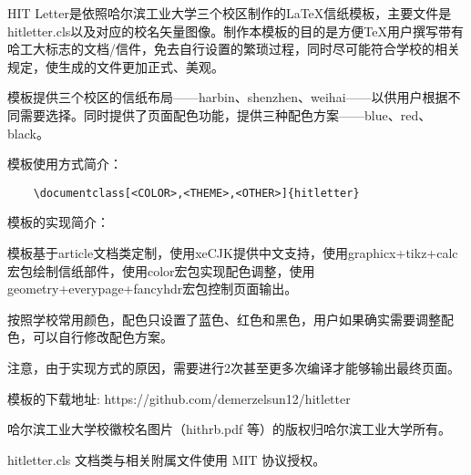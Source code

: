 \documentclass[blue,harbin,pagenum,12pt]{hitletter}
\begin{document}
HIT Letter是依照哈尔滨工业大学三个校区制作的\LaTeX 信纸模板，主要文件是hitletter.cls以及对应的校名矢量图像。制作本模板的目的是方便\TeX 用户撰写带有哈工大标志的文档/信件，免去自行设置的繁琐过程，同时尽可能符合学校的相关规定，使生成的文件更加正式、美观。

模板提供三个校区的信纸布局——harbin、shenzhen、weihai——以供用户根据不同需要选择。同时提供了页面配色功能，提供三种配色方案——blue、red、black。

模板使用方式简介：
\begin{verbatim}
	\documentclass[<COLOR>,<THEME>,<OTHER>]{hitletter}
\end{verbatim}


模板的实现简介：

模板基于article文档类定制，使用xeCJK提供中文支持，使用graphicx+tikz+calc宏包绘制信纸部件，使用color宏包实现配色调整，使用geometry+everypage+fancyhdr宏包控制页面输出。

按照学校常用颜色，配色只设置了蓝色、红色和黑色，用户如果确实需要调整配色，可以自行修改配色方案。

注意，由于实现方式的原因，需要进行2次甚至更多次编译才能够输出最终页面。

模板的下载地址:
https://github.com/demerzelsun12/hitletter

哈尔滨工业大学校徽校名图片（hithrb.pdf 等）的版权归哈尔滨工业大学所有。

hitletter.cls 文档类与相关附属文件使用 MIT 协议授权。

~

\lipsum[1-5]
\end{document}
